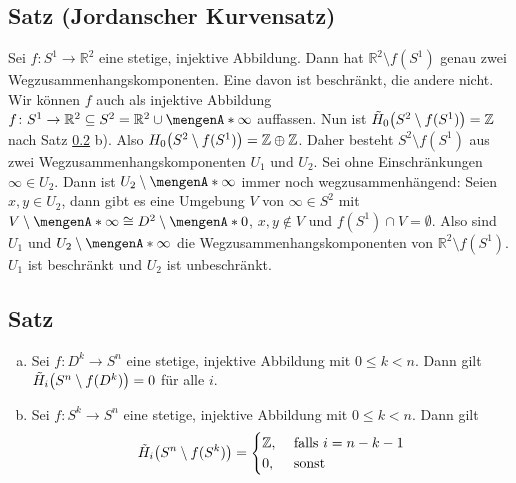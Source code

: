 \subsection{Satz (Jordanscher Kurvensatz)} %
\label{sub:109}
Sei $f \colon S^1 \to \mathds{R}^2$ eine stetige, injektive Abbildung. Dann hat $\mathds{R}^2 \setminus f(S^1)$ genau zwei Wegzusammenhangskomponenten. Eine davon ist 
beschränkt, die andere nicht.
Wir können $f$ auch als injektive Abbildung $f \colon S^1 \to \mathds{R}^2 \subseteq S^2 = \mathds{R}^2 \cup \set{\infty}$ auffassen. Nun ist 
$\tilde{H}_0 \enbrace[\big]{S^2 \setminus f(S^1)} =\mathds{Z}$ nach Satz \ref{sub:1010} b). Also $H_0 \enbrace[\big]{S^2 \setminus f(S^1)}= \mathds{Z} \oplus \mathds{Z}$. 
Daher besteht $S^2 \setminus f(S^1)$ aus zwei Wegzusammenhangskomponenten $U_1$ und $U_2$. Sei ohne Einschränkungen $\infty \in U_2$. Dann ist $U_2 \setminus \set{\infty}$ 
immer noch wegzusammenhängend: Seien $x,y \in U_2$, dann gibt es eine Umgebung $V$ von $\infty \in S^2$ mit $V \setminus \set{\infty} \cong D^2 \setminus \set{0} $, 
$x,y \not\in V$ und $f(S^1) \cap V = \emptyset$. Also sind $U_1$ und $U_2 \setminus \set{\infty}$ die Wegzusammenhangskomponenten von $\mathds{R}^2 \setminus f(S^1)$. $U_1$ 
ist beschränkt und $U_2$ ist unbeschränkt. \bewende

\subsection[Satz: Homologie von $S^n$ ohne Einbettung vonScheiben $D^k$ und Sphären $S^k$ mit $k<n$]{Satz} %
\label{sub:1010}
\begin{enumerate}[a)]
	\item Sei $f \colon D^k \to S^n$ eine stetige, injektive Abbildung mit $0 \le k < n$. Dann gilt $\tilde{H}_i\enbrace[\big]{S^n \setminus f(D^k)} =0$ für alle $i$.
	\item Sei $f \colon S^k \to S^n$ eine stetige, injektive Abbildung mit $0 \le k < n$. Dann gilt 
	\[
		\tilde{H}_i \enbrace[\big]{S^n \setminus f(S^k)} = \begin{cases}
			\mathds{Z}, &\text{ falls }i=n-k-1\\
			0, &\text{ sonst}
		\end{cases}
	\]
\end{enumerate}

